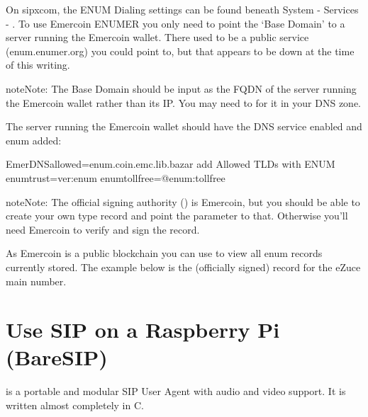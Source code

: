 \documentclass[letterpaper,10pt,english]{sphinxmanual}
\begin{document}
On sipxcom, the ENUM Dialing settings can be found beneath System - Services - {\hyperref[\detokenize{webui:sip-registrar}]{}}.
To use Emercoin ENUMER you only need to point the ‘Base Domain’ to a server running the Emercoin wallet.
There used to be a public service (enum.enumer.org) you could point to, but that appears to be down at the time of this writing.


\begin{sphinxadmonition}{note}{Note:}
The Base Domain should be input as the FQDN of the server running the Emercoin wallet rather than its IP. You may need to {\hyperref[\detokenize{webui:custom-records}]{}} for it in your DNS zone.
\end{sphinxadmonition}

The server running the Emercoin wallet should have the DNS service enabled and enum added:

\begin{sphinxVerbatim}[commandchars=\\\{\}]
EmerDNSallowed=\PYGZdl{}enum\textbar{}.coin\textbar{}.emc\textbar{}.lib\textbar{}.bazar      \PYGZsh{} add Allowed TLDs with ENUM
enumtrust=ver:enum
enumtollfree=@enum:tollfree
\end{sphinxVerbatim}

\begin{sphinxadmonition}{note}{Note:}
The official signing authority () is Emercoin, but you should be able to create your own  type record and point the  parameter to that.
Otherwise you’ll need Emercoin to verify and sign the record.
\end{sphinxadmonition}

As Emercoin is a public blockchain you can use  to view all enum records currently stored.
The example below is the (officially signed) record for the eZuce main number.



\section{Use SIP on a Raspberry Pi (BareSIP)}
\label{\detokenize{howto:use-sip-on-a-raspberry-pi-baresip}}
 is a portable and modular SIP User Agent with audio and video support. It is written almost completely in C.
\end{document}

